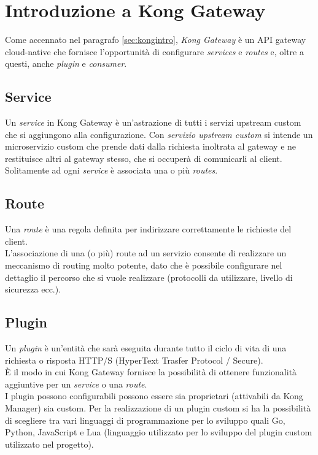 \section{Introduzione a Kong Gateway}\label{sec:kongprog}
Come accennato nel paragrafo \ref{sec:kongintro}, \emph{Kong Gateway} è un API gateway cloud-native che fornisce l’opportunità di configurare \emph{services} e \emph{routes} e, oltre a questi, anche \emph{plugin} e \emph{consumer}.
\subsection{Service}\label{sec:kongservice}
Un \emph{service} in Kong Gateway è un’astrazione di tutti i servizi upstream custom che si aggiungono alla configurazione. Con \emph{servizio upstream custom} si intende un microservizio custom che prende dati dalla richiesta inoltrata al gateway e ne restituisce altri al gateway stesso, che si occuperà di comunicarli al client.\\
Solitamente ad ogni \emph{service} è associata una o più \emph{routes}.\\

\subsection{Route}\label{sec:kongroute}
Una \emph{route} è una regola definita per indirizzare correttamente le richieste del client.\\
L’associazione di una (o più) route ad un servizio consente di realizzare un meccanismo di routing molto potente, dato che è possibile configurare nel dettaglio il percorso che si vuole realizzare (protocolli da utilizzare, livello di sicurezza ecc.).\\

\subsection{Plugin}\label{sec:kongplugin}
Un \emph{plugin} è un’entità che sarà eseguita durante tutto il ciclo di vita di una richiesta o risposta HTTP/S (HyperText Trasfer Protocol / Secure).\\
È il modo in cui Kong Gateway fornisce la possibilità di ottenere funzionalità aggiuntive per un \emph{service} o una \emph{route}.\\
I plugin possono configurabili possono essere sia proprietari (attivabili da Kong Manager) sia custom. Per la realizzazione di un plugin custom si ha la possibilità di scegliere tra vari linguaggi di programmazione per lo sviluppo quali Go, Python, JavaScript e Lua (linguaggio utilizzato per lo sviluppo del plugin custom utilizzato nel progetto).\\ 


